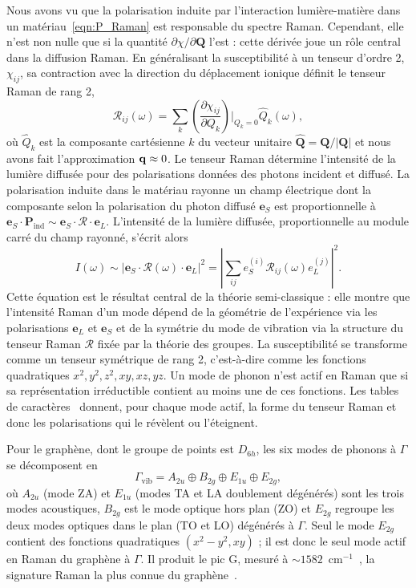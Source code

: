 Nous avons vu que la polarisation induite par l'interaction lumière-matière dans un matériau~\eqref{eqn:P_Raman} est responsable du spectre Raman. Cependant, elle n'est non nulle que si la quantité $\partial\chi/\partial\mathbf{Q}$ l'est : cette dérivée joue un rôle central dans la diffusion Raman. En généralisant la susceptibilité à un tenseur d'ordre 2, $\chi_{ij}$, sa contraction avec la direction du déplacement ionique définit le tenseur Raman de rang 2,
\begin{equation}
    \mathcal{R}_{ij}(\omega)=\sum_k\left(\frac{\partial\chi_{ij}}{\partial Q_k}\right)\bigg\rvert_{Q_k=0}\hat{Q}_k(\omega),
\end{equation}
où $\hat{Q}_k$ est la composante cartésienne $k$ du vecteur unitaire $\hat{\mathbf{Q}}=\mathbf{Q}/|\mathbf{Q}|$ et nous avons fait l'approximation $\mathbf{q}\approx 0$. Le tenseur Raman détermine l'intensité de la lumière diffusée pour des polarisations données des photons incident et diffusé. La polarisation induite dans le matériau rayonne un champ électrique dont la composante selon la polarisation du photon diffusé $\mathbf{e}_S$ est proportionnelle à $\mathbf{e}_S\cdot\mathbf{P}_\text{ind} \sim \mathbf{e}_S\cdot\bm{\mathcal{R}}\cdot\mathbf{e}_L$. L'intensité de la lumière diffusée, proportionnelle au module carré du champ rayonné, s'écrit alors
\begin{equation}
    I(\omega) \sim \left|\mathbf{e}_S\cdot\bm{\mathcal{R}}(\omega)\cdot\mathbf{e}_L\right|^2 = \left|\sum_{ij}e_S^{(i)}\mathcal{R}_{ij}(\omega)e_L^{(j)}\right|^2.
\end{equation}
Cette équation est le résultat central de la théorie semi-classique : elle montre que l'intensité Raman d'un mode dépend de la géométrie de l'expérience via les polarisations $\mathbf{e}_L$ et $\mathbf{e}_S$ et de la symétrie du mode de vibration via la structure du tenseur Raman $\bm{\mathcal{R}}$ fixée par la théorie des groupes. La susceptibilité se transforme comme un tenseur symétrique de rang 2, c'est-à-dire comme les fonctions quadratiques $x^2, y^2, z^2, xy, xz, yz$. Un mode de phonon n'est actif en Raman que si sa représentation irréductible contient au moins une de ces fonctions. Les tables de caractères~\cite{SymmetrySpectroscopy,GroupTheory2008} donnent, pour chaque mode actif, la forme du tenseur Raman et donc les polarisations qui le révèlent ou l'éteignent.

Pour le graphène, dont le groupe de points est $D_{6h}$, les six modes de phonons à $\Gamma$ se décomposent en
\begin{equation}
    \Gamma_\text{vib} = A_{2u}\oplus B_{2g}\oplus E_{1u}\oplus E_{2g},
\end{equation}
où $A_{2u}$ (mode ZA) et $E_{1u}$ (modes TA et LA doublement dégénérés) sont les trois modes acoustiques, $B_{2g}$ est le mode optique hors plan (ZO) et $E_{2g}$ regroupe les deux modes optiques dans le plan (TO et LO) dégénérés à $\Gamma$. Seul le mode $E_{2g}$ contient des fonctions quadratiques $(x^2-y^2, xy)$ ; il est donc le seul mode actif en Raman du graphène à $\Gamma$. Il produit le pic G, mesuré à $\sim 1582$~cm$^{-1}$~\cite{ferrariRamanSpectrumGraphene2006,ferrariRamanSpectroscopyVersatile2013a}, la signature Raman la plus connue du graphène~\cite{ferrariRamanSpectroscopyAmorphous2004}.

